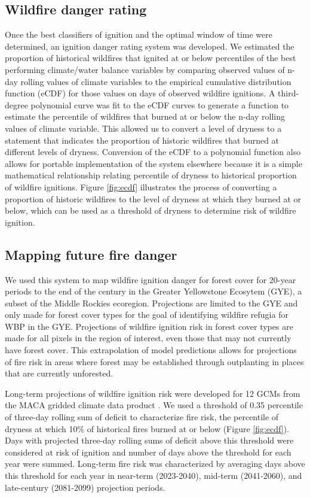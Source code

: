 \documentclass[11p]{article}
\begin{document}
\subsection{Wildfire danger rating}

Once the best classifiers of ignition and the optimal window of time were determined, an ignition danger rating system was developed. We estimated the proportion of historical wildfires that ignited at or below percentiles of the best performing climate/water balance variables by comparing observed values of n-day rolling values of climate variables to the empirical cumulative distribution function (eCDF) for those values on days of observed wildfire ignitions. A third-degree polynomial curve was fit to the eCDF curves to generate a function to estimate the percentile of wildfires that burned at or below the n-day rolling values of climate variable. This allowed us to convert a level of dryness to a statement that indicates the proportion of historic wildfires that burned at different levels of dryness. Conversion of the eCDF to a polynomial function also allows for portable implementation of the system elsewhere because it is a simple mathematical relationship relating percentile of dryness to historical proportion of wildfire ignitions. Figure \ref{fig:ecdf} illustrates the process of converting a proportion of historic wildfires to the level of dryness at which they burned at or below, which can be used as a threshold of dryness to determine risk of wildfire ignition.

\subsection{Mapping future fire danger}

We used this system to map wildfire ignition danger for forest cover for 20-year periods to the end of the century in the Greater Yellowstone Ecosytem (GYE), a subset of the Middle Rockies ecoregion. Projections are limited to the GYE and only made for forest cover types for the goal of identifying wildfire refugia for WBP in the GYE. Projections of wildfire ignition risk in forest cover types are made for all pixels in the region of interest, even those that may not currently have forest cover. This extrapolation of model predictions allows for projections of fire risk in areas where forest may be established through outplanting in places that are currently unforested.

Long-term projections of wildfire ignition risk were developed for 12 GCMs from the MACA gridded climate data product \citep{abatzoglouComparisonStatisticalDownscaling2012}. We used a threshold of 0.35 percentile of three-day rolling sum of deficit to characterize fire risk, the percentile of dryness at which 10\% of historical fires burned at or below (Figure \ref{fig:ecdf}). Days with projected three-day rolling sums of deficit above this threshold were considered at risk of ignition and number of days above the threshold for each year were summed. Long-term fire risk was characterized by averaging days above this threshold for each year in near-term (2023-2040), mid-term (2041-2060), and late-century (2081-2099) projection periods. 
\end{document}
